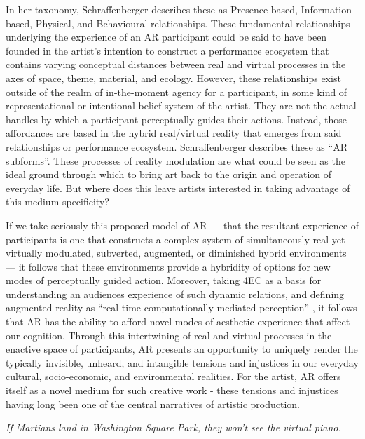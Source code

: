 In her taxonomy, Schraffenberger describes these as Presence-based, Information-based, Physical, and Behavioural relationships. These fundamental relationships underlying the experience of an AR participant could be said to have been founded in the artist’s intention to construct a performance ecosystem that contains varying conceptual distances between real and virtual processes in the axes of space, theme, material, and ecology. However, these relationships exist outside of the realm of in-the-moment agency for a participant, in some kind of representational or intentional belief-system of the artist. They are not the actual handles by which a participant perceptually guides their actions. Instead, those affordances are based in the hybrid real/virtual reality that emerges from said relationships or performance ecosystem. Schraffenberger describes these as “AR subforms”. These processes of reality modulation are what could be seen as the ideal ground through which to bring art back to the origin and operation of everyday life. But where does this leave artists interested in taking advantage of this medium specificity? 

If we take seriously this proposed model of AR — that the resultant experience of participants is one that constructs a complex system of simultaneously real yet virtually modulated, subverted, augmented, or diminished hybrid environments — it follows that these environments provide a hybridity of options for new modes of perceptually guided action. Moreover, taking 4EC as a basis for understanding an audiences experience of such dynamic relations, and defining augmented reality as “real-time computationally mediated perception” \citep[]{chevalier2020}, it follows that AR has the ability to afford novel modes of aesthetic experience that affect our cognition. Through this intertwining of real and virtual processes in the enactive space of participants, AR presents an opportunity to uniquely render the typically invisible, unheard, and intangible tensions and injustices in our everyday cultural, socio-economic, and environmental realities. For the artist, AR offers itself as a novel medium for such creative work - these tensions and injustices having long been one of the central narratives of artistic production.
\clearpage
\newpage



\epigraph{\textit{If Martians land in Washington Square Park, they won't see the virtual piano.}}{\citep[p. 229]{chalmers2022}}
